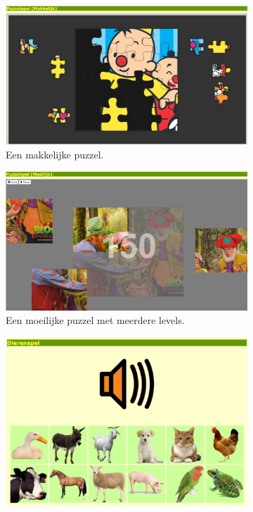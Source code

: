 \documentclass[a4paper,11pt]{article}
\theoremstyle{definition}
\begin{document}
\begin{figure}[h!]
        \centering
        \begin{subfigure}{.5\textwidth}
          \centering
                \includegraphics[scale=0.085]{bumba.jpg}
                \caption{Een makkelijke puzzel.}
                \label{bumba}
        \end{subfigure}%
        \begin{subfigure}{.5\textwidth}
           \centering
                \includegraphics[scale=0.085]{mpuzzel.jpg}
                \caption{Een moeilijke puzzel met meerdere levels.}
                \label{mpuzzel}
        \end{subfigure}
        \begin{subfigure}{1\textwidth}
           \centering
                \includegraphics[scale=0.15]{dieren.jpg}

\end{subfigure}
\end{figure}
\end{document}
